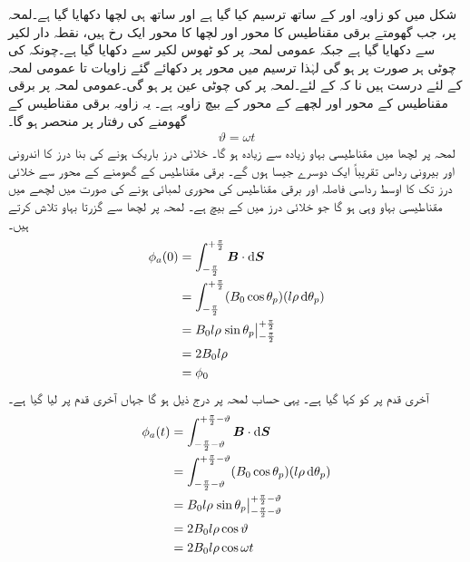 %
شکل   میں  کو زاویہ  اور   کے ساتھ ترسیم کیا گیا ہے اور ساتھ ہی  لچھا  دکھایا گیا ہے۔لمحہ پر، جب  گھومتے برقی مقناطیس کا محور اور لچھا  کا محور ایک رخ  ہیں،  نقطہ دار  لکیر سے  دکھایا گیا ہے جبکہ عمومی  لمحہ  پر   کو  ٹھوس لکیر سے   دکھایا گیا ہے۔چونکہ  کی چوٹی ہر صورت  پر ہو گی لہٰذا  ترسیم میں محور  پر دکھائے گئے زاویات  تا  عمومی لمحہ  کے لئے درست  ہیں نا کہ  کے لئے۔لمحہ  پر  کی چوٹی عین  پر ہو گی۔عمومی  لمحہ  پر برقی مقناطیس کے محور اور لچھے کے محور کے بیچ  زاویہ ہے۔ یہ زاویہ برقی مقناطیس کے گھومنے کی رفتار  پر منحصر ہو گا۔
\begin{align}
\vartheta=\omega t
\end{align}
لمحہ  پر لچھا  میں   مقناطیسی بہاو زیادہ سے زیادہ ہو گا۔ خلائی درز باریک ہونے کی بنا درز کا اندرونی اور بیرونی رداس تقریباً  ایک دوسرے جیسا ہوں گے۔ برقی مقناطیس کے گھومنے کے محور سے  خلائی درز تک کا اوسط رداسی فاصلہ  اور  برقی مقناطیس کی محوری لمبائی  ہونے کی صورت میں لچھے میں  مقناطیسی بہاو وہی ہو گا جو  خلائی درز میں    کے بیچ ہے۔ لمحہ  پر  لچھا  سے گزرتا بہاو  تلاش کرتے ہیں۔
\begin{gather}
\begin{aligned}\label{مساوات_گھومتے_مشین_قطب_پر_بہاو}
\phi_a(0)&=\int_{-\frac{\pi}{2}}^{+\frac{\pi}{2}} \kvec{B} \cdot \dif \kvec{S}\\
&=\int_{-\frac{\pi}{2}}^{+\frac{\pi}{2}} (B_0 \cos \theta_p)(l \rho \dif \theta_p)\\
&=B_0 l \rho \left. \sin \theta_p \right\vert_{-\frac{\pi}{2}}^{+\frac{\pi}{2}}\\
&=2 B_0 l \rho\\
&=\phi_0
\end{aligned}
\end{gather}
آخری قدم پر   کو  کہا گیا ہے۔ یہی حساب  لمحہ  پر درج ذیل ہو گا جہاں آخری قدم پر  لیا گیا ہے۔
\begin{gather}
\begin{aligned}
\phi_a(t)&=\int_{-\frac{\pi}{2}-\vartheta}^{+\frac{\pi}{2}-\vartheta} \kvec{B} \cdot \dif \kvec{S}\\
&=\int_{-\frac{\pi}{2}-\vartheta}^{+\frac{\pi}{2}-\vartheta} (B_0 \cos \theta_p)(l \rho \dif \theta_p)\\
&=B_0 l \rho \left. \sin \theta_p \right\vert_{-\frac{\pi}{2}-\vartheta}^{+\frac{\pi}{2}-\vartheta}\\
&=2 B_0 l \rho \cos \vartheta\\
&=2 B_0 l \rho \cos \omega t
\end{aligned}
\end{gather}
